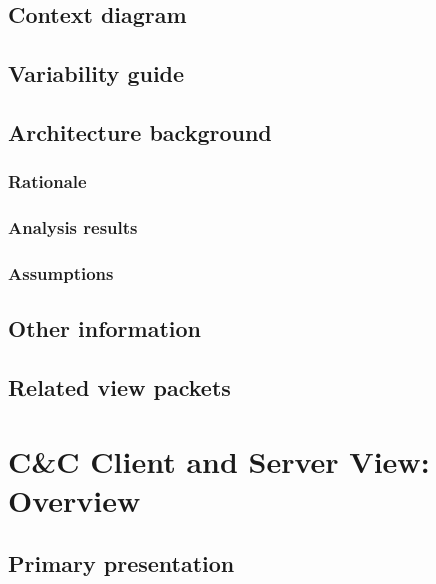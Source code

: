 \documentclass[a4paper,10pt]{article}
\begin{document}
\subsection{Context diagram}

\subsection{Variability guide}

\subsection{Architecture background}

\subsubsection{Rationale}

\subsubsection{Analysis results}

\subsubsection{Assumptions}

\subsection{Other information}

\subsection{Related view packets}




\clearpage
\section{C\&C Client and Server View: Overview}
\label{Client and Server View: Overview}

\subsection{Primary presentation}
\end{document}
